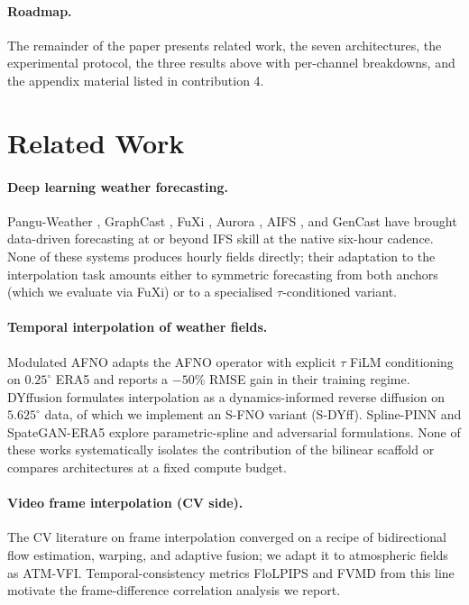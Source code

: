 \documentclass[10pt,letterpaper,twocolumn]{article}
\begin{document}
\paragraph{Roadmap.}
The remainder of the paper presents related work, the seven
architectures, the experimental protocol, the three results above with
per-channel breakdowns, and the appendix material listed in
contribution 4.

\section{Related Work}
\label{sec:related}

\paragraph{Deep learning weather forecasting.}
Pangu-Weather \cite{bi2022pangu}, GraphCast \cite{lam2023graphcast},
FuXi \cite{chen2023fuxi}, Aurora \cite{bodnar2024aurora},
AIFS \cite{lang2024aifs}, and GenCast \cite{price2024genwc} have brought
data-driven forecasting at or beyond IFS skill at the native six-hour
cadence. None of these systems produces hourly fields directly; their
adaptation to the interpolation task amounts either to symmetric
forecasting from both anchors (which we evaluate via FuXi) or to a
specialised $\tau$-conditioned variant.

\paragraph{Temporal interpolation of weather fields.}
Modulated AFNO \cite{leinonen2024modafno} adapts the AFNO operator
\cite{guibas2022afno} with explicit $\tau$ FiLM conditioning on $0.25^\circ$
ERA5 and reports a $-50\%$ RMSE gain in their training regime.
DYffusion \cite{cachay2023dyffusion} formulates interpolation as a
dynamics-informed reverse diffusion on $5.625^\circ$ data, of which we
implement an S-FNO \cite{bonev2023sfno} variant (S-DYff).
Spline-PINN \cite{wandel2022splinepinn} and SpateGAN-ERA5
\cite{vandeschrik2024spategan} explore parametric-spline and adversarial
formulations. None of these works systematically isolates the
contribution of the bilinear scaffold or compares
architectures at a fixed compute budget.

\paragraph{Video frame interpolation (CV side).}
The CV literature on frame interpolation
\cite{huang2022rife,kong2022ifrnet} converged on a recipe of
bidirectional flow estimation, warping, and adaptive fusion; we adapt
it to atmospheric fields as ATM-VFI. Temporal-consistency metrics
FloLPIPS \cite{danier2022flolpips} and FVMD \cite{liu2024fvmd} from
this line motivate the frame-difference correlation analysis we report.
\end{document}
